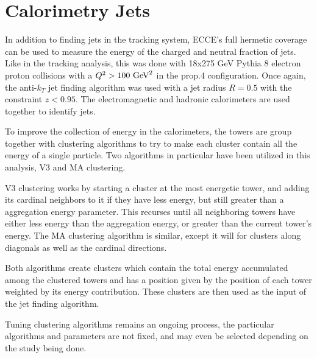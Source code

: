 \section{Calorimetry Jets}
\label{calo_jets}

In addition to finding jets in the tracking system, ECCE's full hermetic coverage can be used to measure the energy of the charged and neutral fraction of jets.  Like in the tracking analysis, this was done with 18x275 GeV Pythia 8 electron proton collisions with a $Q^2>100\hbox{ GeV}^2$ in the prop.4 configuration.  Once again, the anti-$k_T$ jet finding algorithm was used with a jet radius $R=0.5$ with the constraint $z<0.95$.  The electromagnetic and hadronic calorimeters are used together to identify jets.

To improve the collection of energy in the calorimeters, the towers are group together with clustering algorithms to try to make each cluster contain all the energy of a single particle.  Two algorithms in particular have been utilized in this analysis, V3 and MA clustering.

V3 clustering works by starting a cluster at the most energetic tower, and adding its cardinal neighbors to it if they have less energy, but still greater than a aggregation energy parameter.  This recurses until all neighboring towers have either less energy than the aggregation energy, or greater than the current tower's energy.  The MA clustering algorithm is similar, except it will for clusters along diagonals as well as the cardinal directions.  

Both algorithms create clusters which contain the total energy accumulated among the clustered towers and has a position given by the position of each tower weighted by its energy contribution.  These clusters are then used as the input of the jet finding algorithm.  

Tuning clustering algorithms remains an ongoing process, the particular algorithms and parameters are not fixed, and may even be selected depending on the study being done. 


